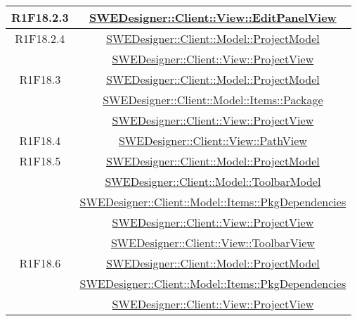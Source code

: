\documentclass[../DefinizioneDiProdotto.tex]{subfiles}
\begin{document}
\begin{longtable}{|c|c|}
				R1F18.2.3
				& \hyperlink{SWEDesigner::Client::View::EditPanelView}{SWEDesigner::Client::View::EditPanelView}\\
				\hline

				R1F18.2.4
				& \hyperlink{SWEDesigner::Client::Model::ProjectModel}{SWEDesigner::Client::Model::ProjectModel}\\
				& \hyperlink{SWEDesigner::Client::View::ProjectView}{SWEDesigner::Client::View::ProjectView}\\
				\hline

				R1F18.3
				& \hyperlink{SWEDesigner::Client::Model::ProjectModel}{SWEDesigner::Client::Model::ProjectModel}\\
				& \hyperlink{SWEDesigner::Client::Model::Items::Package}{SWEDesigner::Client::Model::Items::Package}\\
				& \hyperlink{SWEDesigner::Client::View::ProjectView}{SWEDesigner::Client::View::ProjectView}\\
				\hline

				R1F18.4
				& \hyperlink{SWEDesigner::Client::View::PathView}{SWEDesigner::Client::View::PathView}\\
				\hline

				R1F18.5
				& \hyperlink{SWEDesigner::Client::Model::ProjectModel}{SWEDesigner::Client::Model::ProjectModel}\\
				& \hyperlink{SWEDesigner::Client::Model::ToolbarModel}{SWEDesigner::Client::Model::ToolbarModel}\\
				& \hyperlink{SWEDesigner::Client::Model::Items::PkgDependencies}{SWEDesigner::Client::Model::Items::PkgDependencies}\\
				& \hyperlink{SWEDesigner::Client::View::ProjectView}{SWEDesigner::Client::View::ProjectView}\\
				& \hyperlink{SWEDesigner::Client::View::ToolbarView}{SWEDesigner::Client::View::ToolbarView}\\
				\hline

				R1F18.6
				& \hyperlink{SWEDesigner::Client::Model::ProjectModel}{SWEDesigner::Client::Model::ProjectModel}\\
				& \hyperlink{SWEDesigner::Client::Model::Items::PkgDependencies}{SWEDesigner::Client::Model::Items::PkgDependencies}\\
				& \hyperlink{SWEDesigner::Client::View::ProjectView}{SWEDesigner::Client::View::ProjectView}\\
				\hline


\end{longtable}
\end{document}
